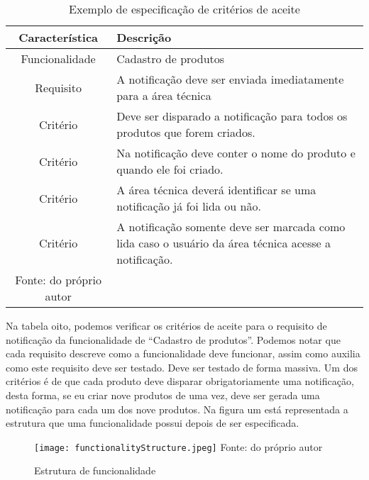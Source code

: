       \begin{table}[h!]
        \centering
        \label{Tabela:8}
        \caption{Exemplo de especificação de critérios de aceite}
        \begin{tabular}{c p{9cm}}
          \hline
          \textbf{Característica} &
          \textbf{Descrição} \\
          \hline
          Funcionalidade &
          Cadastro de produtos \\
          Requisito &
          A notificação deve ser enviada imediatamente para a área técnica \\
          Critério &
          Deve ser disparado a notificação para todos os produtos que forem criados. \\
          Critério &
          Na notificação deve conter o nome do produto e quando ele foi criado. \\
          Critério &
          A área técnica deverá identificar se uma notificação já foi lida ou não. \\
          Critério &
          A notificação somente deve ser marcada como lida caso o usuário da área
          técnica acesse a notificação. \\ \hline
          \newline
          \small{Fonte: do próprio autor}
        \end{tabular}
      \end{table}

      Na tabela oito, podemos verificar os critérios de aceite para o requisito de
      notificação da funcionalidade de “Cadastro de produtos”. Podemos notar que cada
      requisito descreve como a funcionalidade deve funcionar, assim como auxilia
      como este requisito deve ser testado. Deve ser testado de forma massiva.
      Um dos critérios é de que cada produto deve disparar obrigatoriamente uma
      notificação, desta forma, se eu criar nove produtos de uma vez, deve ser
      gerada uma notificação para cada um dos nove produtos. Na figura um está
      representada a estrutura que uma funcionalidade possui depois de ser
      especificada. \newline

      \begin{figure}[h!]
        \label{Imagem:1}
        \caption{Estrutura de funcionalidade}
        \texttt{[image: functionalityStructure.jpeg]}
        \newline
        \small{Fonte: do próprio autor}
      \end{figure}

